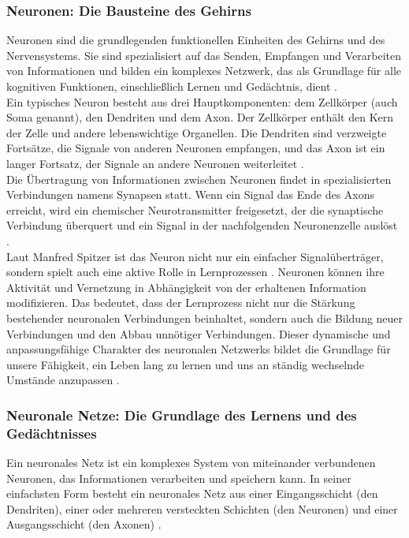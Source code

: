 \subsubsection{Neuronen: Die Bausteine des Gehirns}
Neuronen sind die grundlegenden funktionellen Einheiten des Gehirns und des Nervensystems. Sie sind spezialisiert auf das Senden, Empfangen und Verarbeiten von Informationen und bilden ein komplexes Netzwerk, das als Grundlage für alle kognitiven Funktionen, einschließlich Lernen und Gedächtnis, dient \cite{Bear2015}. \\
\noindent
Ein typisches Neuron besteht aus drei Hauptkomponenten: dem Zellkörper (auch Soma genannt), den Dendriten und dem Axon. Der Zellkörper enthält den Kern der Zelle und andere lebenswichtige Organellen. Die Dendriten sind verzweigte Fortsätze, die Signale von anderen Neuronen empfangen, und das Axon ist ein langer Fortsatz, der Signale an andere Neuronen weiterleitet \cite{Kandel2012}.\\
\noindent
Die Übertragung von Informationen zwischen Neuronen findet in spezialisierten Verbindungen namens Synapsen statt. Wenn ein Signal das Ende des Axons erreicht, wird ein chemischer Neurotransmitter freigesetzt, der die synaptische Verbindung überquert und ein Signal in der nachfolgenden Neuronenzelle auslöst \cite{Bear2015}. \\
\noindent
Laut Manfred Spitzer ist das Neuron nicht nur ein einfacher Signalüberträger, sondern spielt auch eine aktive Rolle in Lernprozessen \cite{Spitzer2002}. Neuronen können ihre Aktivität und Vernetzung in Abhängigkeit von der erhaltenen Information modifizieren. Das bedeutet, dass der Lernprozess nicht nur die Stärkung bestehender neuronalen Verbindungen beinhaltet, sondern auch die Bildung neuer Verbindungen und den Abbau unnötiger Verbindungen. Dieser dynamische und anpassungsfähige Charakter des neuronalen Netzwerks bildet die Grundlage für unsere Fähigkeit, ein Leben lang zu lernen und uns an ständig wechselnde Umstände anzupassen \cite{Spitzer2002}.

\subsubsection{Neuronale Netze: Die Grundlage des Lernens und des Gedächtnisses}
Ein neuronales Netz ist ein komplexes System von miteinander verbundenen Neuronen, das Informationen verarbeiten und speichern kann. In seiner einfachsten Form besteht ein neuronales Netz aus einer Eingangsschicht (den Dendriten), einer oder mehreren versteckten Schichten (den Neuronen) und einer Ausgangsschicht (den Axonen) \cite{Bear2015}. \newline

